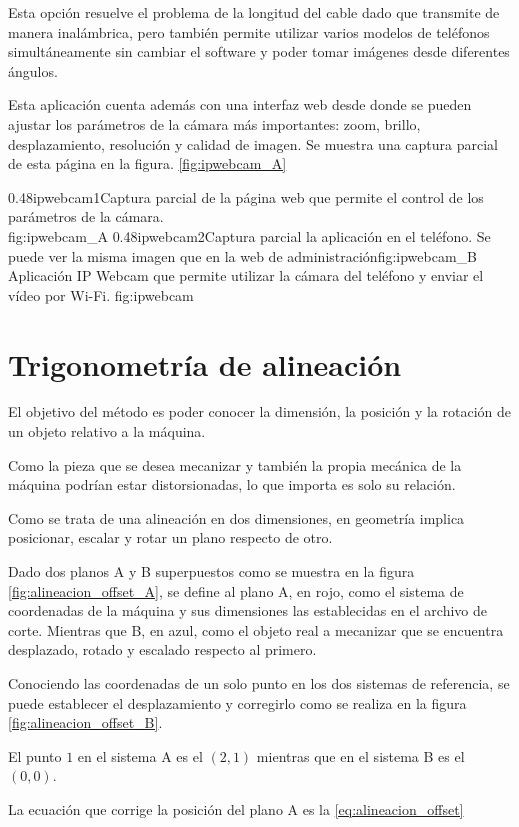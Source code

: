    Esta opción resuelve el problema de la longitud del cable dado que transmite de manera inalámbrica, pero también permite utilizar varios modelos de teléfonos simultáneamente sin cambiar el software y poder tomar imágenes desde diferentes ángulos. \par

   Esta aplicación cuenta además con una interfaz web desde donde se pueden ajustar los parámetros de la cámara más importantes: zoom, brillo, desplazamiento, resolución y calidad de imagen. Se muestra una captura parcial de esta página en la figura. \ref{fig:ipwebcam_A}


\subfigab
{0.48}{ipwebcam1}{Captura parcial de la página web que permite el control de los parámetros de la cámara.\\ \vphantom{1}}{fig:ipwebcam_A}
         {0.48}{ipwebcam2}{Captura parcial la aplicación en el teléfono. Se puede ver la misma imagen que en la web de administración}{fig:ipwebcam_B}
         {Aplicación IP Webcam que permite utilizar la cámara del teléfono y enviar el vídeo por Wi-Fi.}
         {fig:ipwebcam}


\section{Trigonometría de alineación}
\label{section:trigonometria}

   El objetivo del método es poder conocer la dimensión, la posición y la rotación de un objeto relativo a la máquina. \par

Como la pieza que se desea mecanizar y también la propia mecánica de la máquina podrían estar distorsionadas, lo que importa es solo su relación. \par

   Como se trata de una alineación en dos dimensiones, en geometría implica posicionar, escalar y rotar un plano respecto de otro.\par

   Dado dos planos A y B superpuestos como se muestra en la figura \ref{fig:alineacion_offset_A}, se define al plano A, en rojo, como el sistema de coordenadas de la máquina y sus dimensiones las establecidas en el archivo de corte.
   Mientras que B, en azul, como el objeto real a mecanizar que se encuentra desplazado, rotado y escalado respecto al primero.\par
   Conociendo las coordenadas de un solo punto en los dos sistemas de referencia, se puede establecer el desplazamiento y corregirlo como se realiza en la figura \ref{fig:alineacion_offset_B}.\par
   El punto $1$ en el sistema A es el $(2,1)$ mientras que en el sistema B es el $(0,0)$.\par
   La ecuación que corrige la posición del plano A es la \ref{eq:alineacion_offset}

